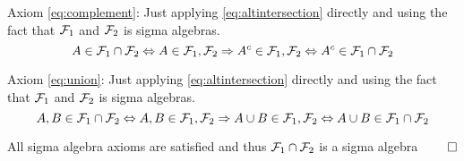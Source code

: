 \documentclass[a4paper,twoside=false,abstract=false,numbers=noenddot,
titlepage=false,headings=small,parskip=half,version=last]{scrartcl}
\begin{document}
\begin{solution}
    Axiom \ref{eq:complement}:
    Just applying \eqref{eq:altintersection} directly and using the fact that
    $\mathcal{F}_1$ and $\mathcal{F}_2$ is sigma algebras.
    \begin{equation}
        A \in \mathcal{F}_1 \cap \mathcal{F}_2 \Leftrightarrow A \in \mathcal{F}_1, \mathcal{F}_2 \Rightarrow
        A^c \in \mathcal{F}_1, \mathcal{F}_2 \Leftrightarrow A^c \in \mathcal{F}_1 \cap \mathcal{F}_2
    \end{equation}

    Axiom \ref{eq:union}:
    Just applying \eqref{eq:altintersection} directly and using the fact that
    $\mathcal{F}_1$ and $\mathcal{F}_2$ is sigma algebras.
    \begin{equation}
        A, B \in \mathcal{F}_1 \cap \mathcal{F}_2 \Leftrightarrow A, B \in \mathcal{F}_1, \mathcal{F}_2 \Rightarrow
        A \cup B \in \mathcal{F}_1, \mathcal{F}_2 \Leftrightarrow A \cup B \in \mathcal{F}_1 \cap \mathcal{F}_2
    \end{equation}

    All sigma algebra axioms are satisfied and thus $\mathcal{F}_1 \cap \mathcal{F}_2$ is a
    sigma algebra $\qed$


%

\end{solution}
\pagebreak
\end{document}
